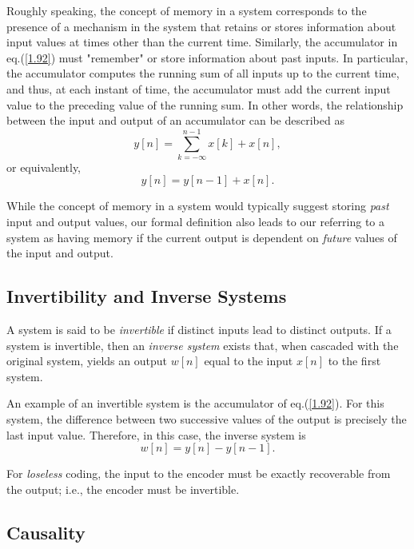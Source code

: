 \documentclass[a4paper,10pt,twoside]{book}
\begin{document}
Roughly speaking, the concept of memory in a system corresponds to the presence of a mechanism in the system that retains or stores information about input values at times other than the current time. Similarly, the accumulator in eq.\;(\ref{1.92}) must "remember" or store information about past inputs. In particular, the accumulator computes the running sum of all inputs up to the current time, and thus, at each instant of time, the accumulator must add the current input value to the preceding value of the running sum. In other words, the relationship between the input and output of an accumulator can be described as
\begin{equation}
    y[n] = \sum_{k = -\infty}^{n-1}x[k] + x[n],
    \label{1.95}
\end{equation}
or equivalently,
\begin{equation}
    y[n]=y[n-1]+x[n].
    \label{1.96}
\end{equation}

While the concept of memory in a system would typically suggest storing \textit{past} input and output values, our formal definition also leads to our referring to a system as having memory if the current output is dependent on \textit{future} values of the input and output.

\subsection{Invertibility and Inverse Systems}

A system is said to be \textit{invertible} if distinct inputs lead to distinct outputs. If a system is invertible, then an \textit{inverse system} exists that, when cascaded with the original system, yields an output $w[n]$ equal to the input $x[n]$ to the first system.

An example of an invertible system is the accumulator of eq.\;(\ref{1.92}). For this system, the difference between two successive values of the output is precisely the last input value. Therefore, in this case, the inverse system is
\begin{equation}
    w[n]=y[n]-y[n-1].
    \label{1.99}
\end{equation}

For \textit{loseless} coding, the input to the encoder must be exactly recoverable from the output; i.e., the encoder must be invertible.

\subsection{Causality}
\label{section:1.6.3}
\end{document}
